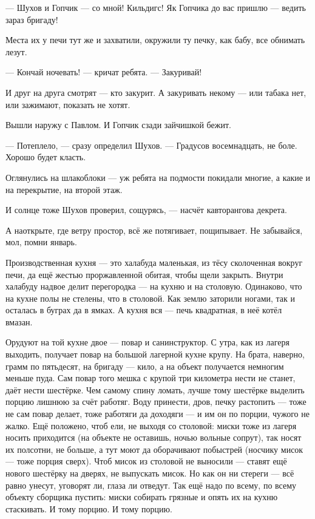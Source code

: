 --- Шухов и Гопчик --- со мной! Кильдигс! Як Гопчика до вас пришлю --- ведить зараз бригаду!

Места их у печи тут же и захватили, окружили ту печку, как бабу, все обнимать лезут.

--- Кончай ночевать! --- кричат ребята. --- Закуривай!

И друг на друга смотрят --- кто закурит. А закуривать некому --- или табака нет, или зажимают,
показать не хотят.

Вышли наружу с Павлом. И Гопчик сзади зайчишкой бежит.

--- Потеплело, --- сразу определил Шухов. --- Градусов восемнадцать, не боле. Хорошо будет класть.

Оглянулись на шлакоблоки --- уж ребята на подмости покидали многие, а какие и на перекрытие,
на второй этаж.

И солнце тоже Шухов проверил, сощурясь, --- насчёт кавторангова декрета.

А наоткрыте, где ветру простор, всё же потягивает, пощипывает. Не забывайся, мол, помни январь.

Производственная кухня --- это халабуда маленькая, из тёсу сколоченная вокруг печи, да ещё
жестью проржавленной обитая, чтобы щели закрыть. Внутри халабуду надвое делит перегородка
--- на кухню и на столовую. Одинаково, что на кухне полы не стелены, что в столовой. Как землю
заторили ногами, так и осталась в буграх да в ямках. А кухня вся --- печь квадратная, в неё
котёл вмазан.

Орудуют на той кухне двое --- повар и санинструктор. С утра, как из лагеря выходить, получает
повар на большой лагерной кухне крупу. На брата, наверно, грамм по пятьдесят, на бригаду ---
кило, а на объект получается немногим меньше пуда. Сам повар того мешка с крупой три
километра нести не станет, даёт нести шестёрке. Чем самому спину ломать, лучше тому шестёрке
выделить порцию лишнюю за счёт работяг. Воду принести, дров, печку растопить --- тоже не сам
повар делает, тоже работяги да доходяги --- и им он по порции, чужого не жалко. Ещё положено,
чтоб ели, не выходя со столовой: миски тоже из лагеря носить приходится (на объекте не
оставишь, ночью вольные сопрут), так носят их полсотни, не больше, а тут моют да оборачивают
побыстрей (носчику мисок --- тоже порция сверх). Чтоб мисок из столовой не выносили --- ставят
ещё нового шестёрку на дверях, не выпускать мисок. Но как он ни стереги --- всё равно унесут,
уговорят ли, глаза ли отведут. Так ещё надо по всему, по всему объекту сборщика пустить: миски
собирать грязные и опять их на кухню стаскивать. И тому порцию. И тому порцию.

